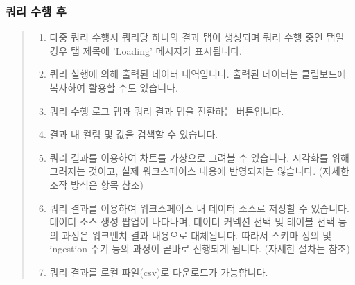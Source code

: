 \documentclass[letterpaper,10pt,english]{sphinxmanual}
\begin{document}
\subsubsection{쿼리 수행 후}
\label{\detokenize{discovery/part06/06_03-use_a_workbench:id7}}\begin{quote}

\begin{figure}[H]
\centering

\noindent{}
\end{figure}
\begin{enumerate}
\def\theenumi{\arabic{enumi}}
\def\labelenumi{\theenumi .}
\makeatletter\def\p@enumii{\p@enumi \theenumi .}\makeatother
\item {} 
 다중 쿼리 수행시 쿼리당 하나의 결과 탭이 생성되며 쿼리 수행 중인 탭일 경우 탭 제목에 'Loading' 메시지가 표시됩니다.

\item {} 
 쿼리 실행에 의해 출력된 데이터 내역입니다. 출력된 데이터는 클립보드에 복사하여 활용할 수도 있습니다.

\item {} 
 쿼리 수행 로그 탭과 쿼리 결과 탭을 전환하는 버튼입니다.

\item {} 
 결과 내 컬럼 및 값을 검색할 수 있습니다.

\item {} 
 쿼리 결과를 이용하여 차트를 가상으로 그려볼 수 있습니다. 시각화를 위해 그려지는 것이고, 실제 워크스페이스 내용에 반영되지는 않습니다. (자세한 조작 방식은 {\hyperref[\detokenize{discovery/part04/manage_charts::doc}]{}} 항목 참조)

\item {} 
 쿼리 결과를 이용하여 워크스페이스 내 데이터 소스로 저장할 수 있습니다. 데이터 소스 생성 팝업이 나타나며, 데이터 커넥션 선택 및 테이블 선택 등의 과정은 워크벤치 결과 내용으로 대체됩니다. 따라서 스키마 정의 및 ingestion 주기 등의 과정이 곧바로 진행되게 됩니다. (자세한 절차는 {\hyperref[\detokenize{discovery/part02/create_a_data_source::doc}]{}} 참조)

\item {} 
 쿼리 결과를 로컬 파일(csv)로 다운로드가 가능합니다.


\end{enumerate}
\end{quote}
\end{document}
